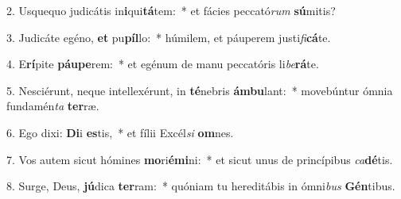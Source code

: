 2. Usquequo judicátis in\textbf{i}qui\textbf{tá}tem:~*  et fácies peccató\textit{rum} \textbf{sú}mitis?\

3. Judicáte egéno, \textbf{et} pu\textbf{píl}lo:~*  húmilem, et páuperem justi\textit{fi}\textbf{cá}te.\

4. E\textbf{rí}pite \textbf{páu}\textbf{pe}rem:~*  et egénum de manu peccatóris li\textit{be}\textbf{rá}te.\

5. Nesciérunt, neque intellexérunt, in \textbf{té}nebris \textbf{ám}\textbf{bu}lant:~*  movebúntur ómnia fundamén\textit{ta} \textbf{ter}ræ.\

6. Ego dixi: \textbf{Di}i \textbf{es}tis,~*  et fílii Excél\textit{si} \textbf{om}nes.\

7. Vos autem sicut hómines \textbf{mo}ri\textbf{é}\textbf{mi}ni:~*  et sicut unus de princípibus \textit{ca}\textbf{dé}tis.\

8. Surge, Deus, \textbf{jú}dica \textbf{ter}ram:~*  quóniam tu hereditábis in ómni\textit{bus} \textbf{Gén}tibus.\


